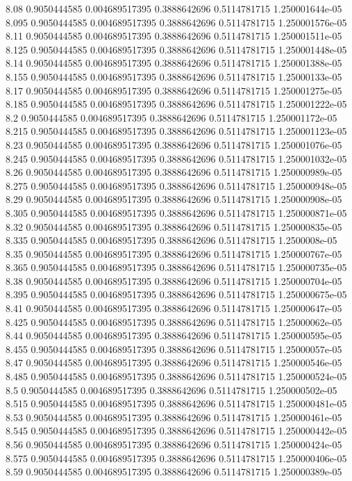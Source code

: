 {8.08 0.9050444585 0.004689517395 0.3888642696 0.5114781715 1.250001644e-05
8.095 0.9050444585 0.004689517395 0.3888642696 0.5114781715 1.250001576e-05
8.11 0.9050444585 0.004689517395 0.3888642696 0.5114781715 1.250001511e-05
8.125 0.9050444585 0.004689517395 0.3888642696 0.5114781715 1.250001448e-05
8.14 0.9050444585 0.004689517395 0.3888642696 0.5114781715 1.250001388e-05
8.155 0.9050444585 0.004689517395 0.3888642696 0.5114781715 1.25000133e-05
8.17 0.9050444585 0.004689517395 0.3888642696 0.5114781715 1.250001275e-05
8.185 0.9050444585 0.004689517395 0.3888642696 0.5114781715 1.250001222e-05
8.2 0.9050444585 0.004689517395 0.3888642696 0.5114781715 1.250001172e-05
8.215 0.9050444585 0.004689517395 0.3888642696 0.5114781715 1.250001123e-05
8.23 0.9050444585 0.004689517395 0.3888642696 0.5114781715 1.250001076e-05
8.245 0.9050444585 0.004689517395 0.3888642696 0.5114781715 1.250001032e-05
8.26 0.9050444585 0.004689517395 0.3888642696 0.5114781715 1.250000989e-05
8.275 0.9050444585 0.004689517395 0.3888642696 0.5114781715 1.250000948e-05
8.29 0.9050444585 0.004689517395 0.3888642696 0.5114781715 1.250000908e-05
8.305 0.9050444585 0.004689517395 0.3888642696 0.5114781715 1.250000871e-05
8.32 0.9050444585 0.004689517395 0.3888642696 0.5114781715 1.250000835e-05
8.335 0.9050444585 0.004689517395 0.3888642696 0.5114781715 1.2500008e-05
8.35 0.9050444585 0.004689517395 0.3888642696 0.5114781715 1.250000767e-05
8.365 0.9050444585 0.004689517395 0.3888642696 0.5114781715 1.250000735e-05
8.38 0.9050444585 0.004689517395 0.3888642696 0.5114781715 1.250000704e-05
8.395 0.9050444585 0.004689517395 0.3888642696 0.5114781715 1.250000675e-05
8.41 0.9050444585 0.004689517395 0.3888642696 0.5114781715 1.250000647e-05
8.425 0.9050444585 0.004689517395 0.3888642696 0.5114781715 1.25000062e-05
8.44 0.9050444585 0.004689517395 0.3888642696 0.5114781715 1.250000595e-05
8.455 0.9050444585 0.004689517395 0.3888642696 0.5114781715 1.25000057e-05
8.47 0.9050444585 0.004689517395 0.3888642696 0.5114781715 1.250000546e-05
8.485 0.9050444585 0.004689517395 0.3888642696 0.5114781715 1.250000524e-05
8.5 0.9050444585 0.004689517395 0.3888642696 0.5114781715 1.250000502e-05
8.515 0.9050444585 0.004689517395 0.3888642696 0.5114781715 1.250000481e-05
8.53 0.9050444585 0.004689517395 0.3888642696 0.5114781715 1.250000461e-05
8.545 0.9050444585 0.004689517395 0.3888642696 0.5114781715 1.250000442e-05
8.56 0.9050444585 0.004689517395 0.3888642696 0.5114781715 1.250000424e-05
8.575 0.9050444585 0.004689517395 0.3888642696 0.5114781715 1.250000406e-05
8.59 0.9050444585 0.004689517395 0.3888642696 0.5114781715 1.250000389e-05
}
